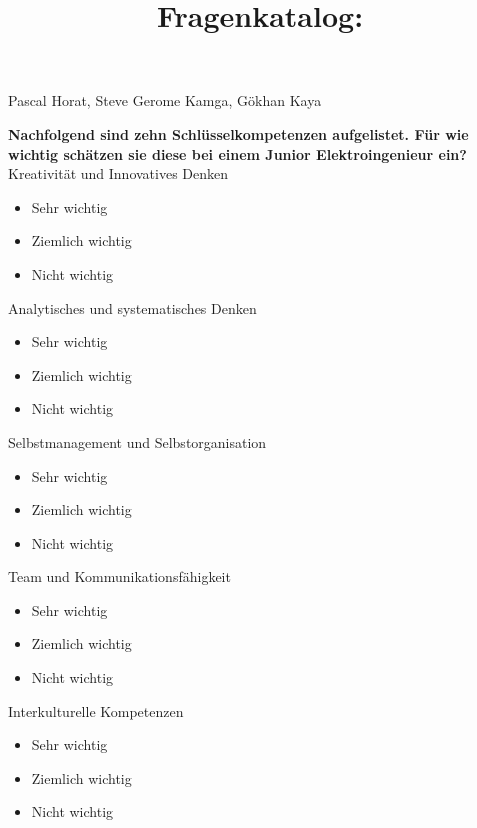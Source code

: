 \documentclass{article}
\title{Fragenkatalog:}
\date{}             %
\begin{document}
 

\maketitle
Pascal Horat, Steve Gerome Kamga, Gökhan Kaya

\addvspace{15mm}


\textbf{Nachfolgend sind zehn Schlüsselkompetenzen aufgelistet. Für wie wichtig schätzen sie diese bei einem Junior Elektroingenieur ein?}\\


Kreativität und Innovatives Denken 

\begin{itemize}[label={\Square}] 
\item Sehr wichtig
\item Ziemlich wichtig
\item Nicht wichtig
\end{itemize} 
\bigskip 

Analytisches und systematisches Denken

\begin{itemize}[label={\Square}] 
\item Sehr wichtig
\item Ziemlich wichtig
\item Nicht wichtig
\end{itemize} 
\bigskip 

Selbstmanagement und Selbstorganisation

\begin{itemize}[label={\Square}] 
\item Sehr wichtig
\item Ziemlich wichtig
\item Nicht wichtig
\end{itemize} 
\bigskip 

Team und Kommunikationsfähigkeit

\begin{itemize}[label={\Square}] 
\item Sehr wichtig
\item Ziemlich wichtig
\item Nicht wichtig
\end{itemize} 
\bigskip 

Interkulturelle Kompetenzen

\begin{itemize}[label={\Square}] 
\item Sehr wichtig
\item Ziemlich wichtig
\item Nicht wichtig
\end{itemize} 
\bigskip 
\end{document}
